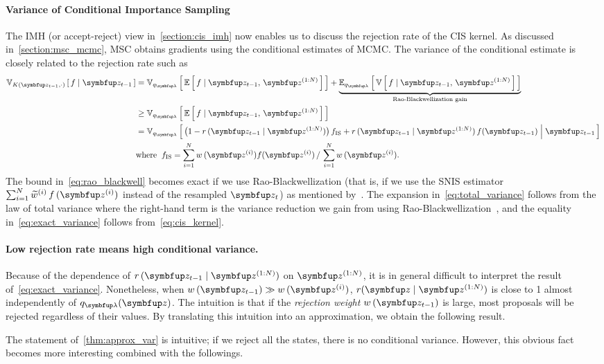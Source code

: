 \paragraph{Variance of Conditional Importance Sampling}
The IMH (or accept-reject) view in~\cref{section:cis_imh} now enables us to discuss the rejection rate of the CIS kernel.
As discussed in~\cref{section:msc_mcmc}, MSC obtains gradients using the conditional estimates of MCMC.
The variance of the conditional estimate is closely related to the rejection rate such as
\begin{align}
  \Vsub{K(\vz_{t-1},\cdot)}{f \mid \vz_{t-1}} 
  &=\Vsub{q_{\vlambda}}{ \E{ f \mid \vz_{t-1},\,\vz^{(1:N)} } } + \underbrace{\Esub{q_{\vlambda}}{ \V{ f \mid \vz_{t-1},\,\vz^{(1:N)} } }}_{\text{Rao-Blackwellization gain}} \label{eq:total_variance} \\
  &\geq \Vsub{q_{\vlambda}}{ \E{ f \mid \vz_{t-1},\,\vz^{(1:N)} } } \label{eq:rao_blackwell}\\
  &= \Vsub{q_{\vlambda}}{ \big(1 - r\,(\vz_{t-1}\mid\vz^{(1:N)})\big)\, f_{\mathrm{IS}}
    + r\,(\vz_{t-1}\mid\vz^{(1:N)})\,f(\vz_{t-1}) \;\middle\vert\; \vz_{t-1} } \label{eq:exact_variance} \\
  &\text{where}\;\; f_{\mathrm{IS}} = {\sum_{i=1}^N w\,(\vz^{(i)}) f(\vz^{(i)})\,/\,\sum_{i=1}^N w\,(\vz^{(i)})}. \nonumber 
\end{align}
%
The bound in~\eqref{eq:rao_blackwell} becomes exact if we use Rao-Blackwellization (that is, if we use the SNIS estimator \(\sum^{N}_{i=1} \widetilde{w}^{(i)}\,f\,(\vz^{(i)})\) instead of the resampled \(\vz_t\)) as mentioned by~\citet{NEURIPS2020_b2070693}.
The expansion in~\eqref{eq:total_variance} follows from the law of total variance where the right-hand term is the variance reduction we gain from using Rao-Blackwellization~\citep{bernton_locally_2015}, and the equality in~\eqref{eq:exact_variance} follows from~\eqref{eq:cis_kernel}.

\vspace{-0.1in}
\paragraph{Low rejection rate means high conditional variance.}
Because of the dependence of \(r\,(\vz_{t-1}\mid\vz^{(1:N)})\) on \(\vz^{(1:N)}\), it is in general difficult to interpret the result of~\eqref{eq:exact_variance}.
Nonetheless, when \(w\,(\vz_{t-1}) \gg w\,(\vz^{(i)})\), \(r(\vz\mid\vz^{(1:N)})\) is close to 1 almost independently of \(q_{\vlambda}(\vz)\).
The intuition is that if the \textit{rejection weight} \(w\,(\vz_{t-1})\) is large, most proposals will be rejected regardless of their values.
By translating this intuition into an approximation, we obtain the following result.
%

%
The statement of~\cref{thm:approx_var} is intuitive; if we reject all the states, there is no conditional variance.
However, this obvious fact becomes more interesting combined with the followings.

